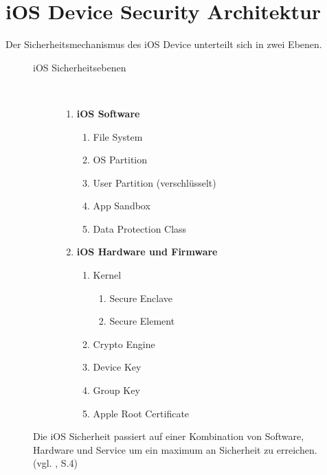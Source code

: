 \pagebreak
\section{iOS Device Security Architektur}
\label{sec:iOSSecArchitektur}

Der Sicherheitsmechanismus des iOS Device unterteilt sich in zwei Ebenen. 
\begin{figure}[htb]
  \begin{minipage}{0.6\textwidth} 
  		\begin{description}
   			\item[ iOS Sicherheitsebenen]~\par
         		\begin{enumerate}	
				\item  \textbf{iOS Software}
					\begin{enumerate}
       						\item File System
         					\item OS Partition
						\item User Partition (verschlüsselt)
						\item App Sandbox
						\item Data Protection Class
      					\end{enumerate}
      				\item  \textbf{iOS Hardware und Firmware}~\par
					\begin{enumerate}
       						\item Kernel
						\begin{enumerate}
						\item Secure Enclave
						\item Secure Element
         					\end{enumerate}	
						\item Crypto Engine
						\item Device Key
						\item Group Key
						\item Apple Root Certificate
      					\end{enumerate}
			\end{enumerate}
   		\end{description}
Die iOS Sicherheit passiert auf einer Kombination von Software, Hardware und Service um ein maximum an Sicherheit zu erreichen. (vgl. \cite{Apple[4]}, S.4)
	\end{minipage}
	\hfil
	\begin{minipage}{0.4\textwidth}

\end{minipage}
\end{figure}
